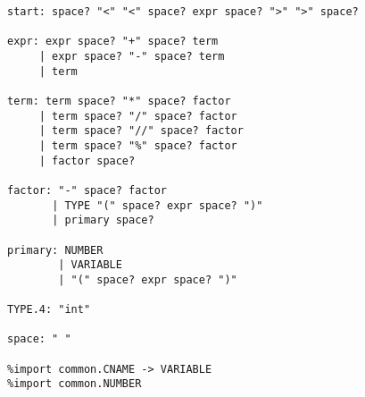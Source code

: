 
\begin{lstlisting}[style=myGrammarStyle, caption=GSM-Symbolic Grammar]
start: space? "<" "<" space? expr space? ">" ">" space?

expr: expr space? "+" space? term   
     | expr space? "-" space? term   
     | term

term: term space? "*" space? factor 
     | term space? "/" space? factor 
     | term space? "//" space? factor 
     | term space? "%" space? factor  
     | factor space?

factor: "-" space? factor    
       | TYPE "(" space? expr space? ")" 
       | primary space?

primary: NUMBER        
        | VARIABLE      
        | "(" space? expr space? ")"

TYPE.4: "int"

space: " "

%import common.CNAME -> VARIABLE
%import common.NUMBER
\end{lstlisting}
\label{gram:gsm_grammar}
